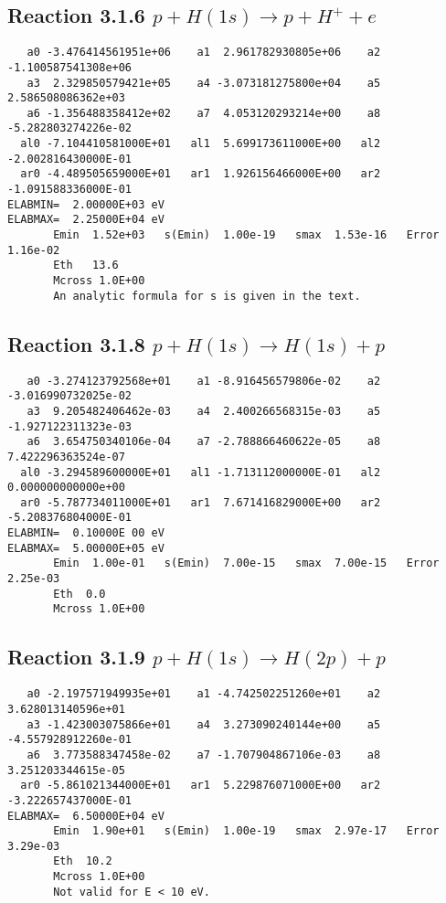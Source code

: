 \documentclass[12pt,dvipdfm]{article}
\begin{document}
\newpage
\subsection{
Reaction 3.1.6 $   p + H(1s) \rightarrow p + H^+ + e$}


\begin{small}\begin{verbatim}
   a0 -3.476414561951e+06    a1  2.961782930805e+06    a2 -1.100587541308e+06
   a3  2.329850579421e+05    a4 -3.073181275800e+04    a5  2.586508086362e+03
   a6 -1.356488358412e+02    a7  4.053120293214e+00    a8 -5.282803274226e-02
  al0 -7.104410581000E+01   al1  5.699173611000E+00   al2 -2.002816430000E-01
  ar0 -4.489505659000E+01   ar1  1.926156466000E+00   ar2 -1.091588336000E-01
ELABMIN=  2.00000E+03 eV
ELABMAX=  2.25000E+04 eV
       Emin  1.52e+03   s(Emin)  1.00e-19   smax  1.53e-16   Error  1.16e-02
       Eth   13.6
       Mcross 1.0E+00
       An analytic formula for s is given in the text.
\end{verbatim}\end{small}






\newpage
\subsection{
Reaction 3.1.8 $   p + H(1s) \rightarrow H(1s) + p$}


\begin{small}\begin{verbatim}
   a0 -3.274123792568e+01    a1 -8.916456579806e-02    a2 -3.016990732025e-02
   a3  9.205482406462e-03    a4  2.400266568315e-03    a5 -1.927122311323e-03
   a6  3.654750340106e-04    a7 -2.788866460622e-05    a8  7.422296363524e-07
  al0 -3.294589600000E+01   al1 -1.713112000000E-01   al2  0.000000000000e+00
  ar0 -5.787734011000E+01   ar1  7.671416829000E+00   ar2 -5.208376804000E-01
ELABMIN=  0.10000E 00 eV
ELABMAX=  5.00000E+05 eV
       Emin  1.00e-01   s(Emin)  7.00e-15   smax  7.00e-15   Error  2.25e-03
       Eth  0.0
       Mcross 1.0E+00
\end{verbatim}\end{small}

\newpage
\subsection{
Reaction 3.1.9 $   p + H(1s) \rightarrow H(2p) + p$}


\begin{small}\begin{verbatim}
   a0 -2.197571949935e+01    a1 -4.742502251260e+01    a2  3.628013140596e+01
   a3 -1.423003075866e+01    a4  3.273090240144e+00    a5 -4.557928912260e-01
   a6  3.773588347458e-02    a7 -1.707904867106e-03    a8  3.251203344615e-05
  ar0 -5.861021344000E+01   ar1  5.229876071000E+00   ar2 -3.222657437000E-01
ELABMAX=  6.50000E+04 eV
       Emin  1.90e+01   s(Emin)  1.00e-19   smax  2.97e-17   Error  3.29e-03
       Eth  10.2
       Mcross 1.0E+00
       Not valid for E < 10 eV.
\end{verbatim}\end{small}
\end{document}
